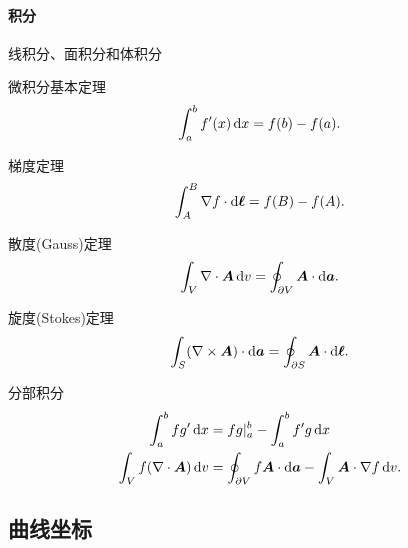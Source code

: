 \paragraph{积分}
\begin{compactitem}
	\item 线积分、面积分和体积分
	\item 微积分基本定理
	\[
        \int_a^b f'(x)\mathop{}\!\mathrm{d} x=f(b)-f(a).
    \]
    \item 梯度定理
    \begin{align}
        \int_A^B\nabla f\cdot\mathop{}\!\mathrm{d}\bm\ell=f(B)-f(A).
    \end{align}
    \item 散度(Gauss)定理
    \begin{align}\label{eqn:div}
        \int_V\nabla\cdot\bm A\mathop{}\!\mathrm{d} v=\oint_{\partial V}\bm A\cdot\mathop{}\!\mathrm{d}\bm a.
    \end{align}
    \item 旋度(Stokes)定理
    \begin{align}\label{eqn:curl}
        \int_S(\nabla\times\bm A)\cdot\mathop{}\!\mathrm{d}\bm a=\oint_{\partial S}\bm A\cdot\mathop{}\!\mathrm{d}\bm\ell.
    \end{align}
    \item 分部积分
    \begin{align}\notag
        \int_a^bfg'\mathop{}\!\mathrm{d} x&=fg|_a^b-\int_a^bf'g\mathop{}\!\mathrm{d} x\\
        \int_Vf(\nabla\cdot\bm A)\mathop{}\!\mathrm{d} v&=\oint_{\partial V}f\bm A\cdot\mathop{}\!\mathrm{d}\bm a-\int_V\bm A\cdot\nabla f\mathop{}\!\mathrm{d} v.
    \end{align}
\end{compactitem}
\subsection{曲线坐标}
